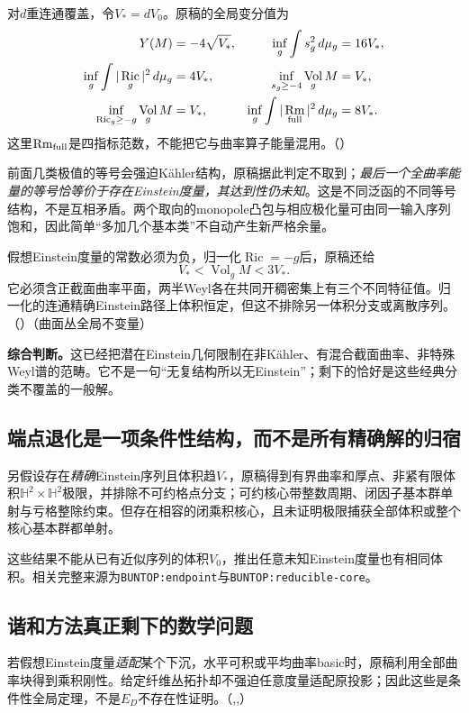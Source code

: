 \documentclass[UTF8,fontset=fandol,zihao=-4]{ctexart}
\theoremstyle{research}
\DeclareMathOperator{\Ric}{Ric}
\DeclareMathOperator{\Rm}{Rm}
\DeclareMathOperator{\Vol}{Vol}
\newcommand{\dd}{\,d\mu_g}
\numberwithin{equation}{section}
\begin{document}
对$d$重连通覆盖，令$V_*=dV_0$。原稿的全局变分值为
\begin{align}
Y(M)&=-4\sqrt{V_*},& \inf_g\int s_g^2\dd&=16V_*,\\
\inf_g\int|\Ric_g|^2\dd&=4V_*,&
\inf_{s_g\ge-4}\Vol_gM&=V_*,\\
\inf_{\Ric_g\ge-g}\Vol_gM&=V_*,&
\inf_g\int|\Rm_{\rm full}|^2\dd&=8V_*.
\end{align}
这里$\Rm_{\rm full}$是四指标范数，不能把它与曲率算子能量混用。\cite{L}（）

前面几类极值的等号会强迫Kähler结构，原稿据此判定不取到；\emph{最后一个全曲率能量的等号恰等价于存在Einstein度量，其达到性仍未知}。这是不同泛函的不同等号结构，不是互相矛盾。两个取向的monopole凸包与相应极化量可由同一输入序列饱和，因此简单“多加几个基本类”不自动产生新严格余量。

假想Einstein度量的常数必须为负，归一化$\Ric=-g$后，原稿还给
\[
V_*<\Vol_gM<3V_*.
\]
它必须含正截面曲率平面，两半Weyl各在共同开稠密集上有三个不同特征值。归一化的连通精确Einstein路径上体积恒定，但这不排除另一体积分支或离散序列。\cite{L}（）\cite{G}（曲面丛全局不变量）

\textbf{综合判断。}这已经把潜在Einstein几何限制在非Kähler、有混合截面曲率、非特殊Weyl谱的范畴。它不是一句“无复结构所以无Einstein”；剩下的恰好是这些经典分类不覆盖的一般解。

\subsection{端点退化是一项条件性结构，而不是所有精确解的归宿}
另假设存在\emph{精确}Einstein序列且体积趋$V_*$，原稿得到有界曲率和厚点、非紧有限体积$\mathbb H^2\times\mathbb H^2$极限，并排除不可约格点分支；可约核心带整数周期、闭因子基本群单射与亏格整除约束。但存在相容的闭乘积核心，且未证明极限捕获全部体积或整个核心基本群都单射。

这些结果不能从已有近似序列的体积$V_0$，推出任意未知Einstein度量也有相同体积。相关完整来源为\texttt{BUNTOP:endpoint}与\texttt{BUNTOP:reducible-core}。\cite{L,G}

\subsection{谐和方法真正剩下的数学问题}
若假想Einstein度量\emph{适配}某个下沉，水平可积或平均曲率basic时，原稿利用全部曲率块得到乘积刚性。给定纤维丛拓扑却不强迫任意度量适配原投影；因此这些是条件性全局定理，不是$E_D$不存在性证明。\cite{L}（,,）
\end{document}
